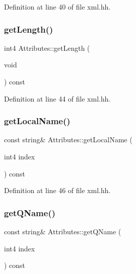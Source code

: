 Definition at line 40 of file xml.\+hh.

\mbox{\label{class_attributes_a336a1c1696086546233624fb0c2e693c}} 
\subsubsection{\texorpdfstring{getLength()}{getLength()}}
{\footnotesize\ttfamily int4 Attributes\+::get\+Length (\begin{DoxyParamCaption}\item[{void}]{ }\end{DoxyParamCaption}) const\hspace{0.3cm}{\ttfamily [inline]}}



Definition at line 44 of file xml.\+hh.

\mbox{\label{class_attributes_a4f09b15c3cb6b028b286da593ca7a7d5}} 
\subsubsection{\texorpdfstring{getLocalName()}{getLocalName()}}
{\footnotesize\ttfamily const string\& Attributes\+::get\+Local\+Name (\begin{DoxyParamCaption}\item[{int4}]{index }\end{DoxyParamCaption}) const\hspace{0.3cm}{\ttfamily [inline]}}



Definition at line 46 of file xml.\+hh.

\mbox{\label{class_attributes_afdf2edc0fc509c437fc732db7979fdae}} 
\subsubsection{\texorpdfstring{getQName()}{getQName()}}
{\footnotesize\ttfamily const string\& Attributes\+::get\+Q\+Name (\begin{DoxyParamCaption}\item[{int4}]{index }\end{DoxyParamCaption}) const\hspace{0.3cm}{\ttfamily [inline]}}



